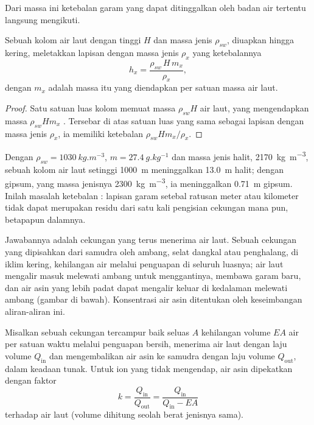 Dari massa ini ketebalan garam yang dapat ditinggalkan oleh badan air tertentu langsung mengikuti.

\begin{proposition}\label{prop:b1:chemical-biogenic-sediments:column}
Sebuah kolom air laut dengan tinggi $H$ dan massa jenis $\rho_{sw}$, diuapkan hingga kering, meletakkan lapisan  dengan massa jenis $\rho_x$ yang ketebalannya
\[
h_x = \frac{\rho_{sw}\,H\,m_x}{\rho_x},
\]
dengan $m_x$ adalah massa  itu yang diendapkan per satuan massa air laut.
\end{proposition}

\begin{proof}
Satu satuan luas kolom memuat massa $\rho_{sw}H$ air laut, yang mengendapkan massa $\rho_{sw}Hm_x$ . Tersebar di atas satuan luas yang sama sebagai lapisan dengan massa jenis $\rho_x$, ia memiliki ketebalan $\rho_{sw}Hm_x/\rho_x$.
\end{proof}

Dengan $\rho_{sw} = \qty{1030}{kg.m^{-3}}$, $m = \qty{27.4}{g.kg^{-1}}$ dan massa jenis halit, \qty{2170}{kg.m^{-3}}, sebuah kolom air laut setinggi \qty{1000}{m} meninggalkan \qty{13.0}{m} halit; dengan gipsum, yang massa jenisnya \qty{2300}{kg.m^{-3}}, ia meninggalkan \qty{0.71}{m} gipsum. Inilah masalah ketebalan : lapisan garam setebal ratusan meter atau kilometer tidak dapat merupakan residu dari satu kali pengisian cekungan mana pun, betapapun dalamnya.

Jawabannya adalah cekungan yang terus menerima air laut. Sebuah cekungan yang dipisahkan dari samudra oleh ambang, selat dangkal atau penghalang, di iklim kering, kehilangan air melalui penguapan di seluruh luasnya; air laut mengalir masuk melewati ambang untuk menggantinya, membawa garam baru, dan air asin yang lebih padat dapat mengalir keluar di kedalaman melewati ambang (gambar di bawah). Konsentrasi air asin ditentukan oleh keseimbangan aliran-aliran ini.

\begin{proposition}\label{prop:b1:chemical-biogenic-sediments:barred}
Misalkan sebuah cekungan tercampur baik seluas $A$ kehilangan volume $EA$ air per satuan waktu melalui penguapan bersih, menerima air laut dengan laju volume $Q_{\mathrm{in}}$ dan mengembalikan air asin ke samudra dengan laju volume $Q_{\mathrm{out}}$, dalam keadaan tunak. Untuk ion yang tidak mengendap, air asin dipekatkan dengan faktor
\[
k = \frac{Q_{\mathrm{in}}}{Q_{\mathrm{out}}} = \frac{Q_{\mathrm{in}}}{Q_{\mathrm{in}} - EA}
\]
terhadap air laut (volume dihitung seolah berat jenisnya sama).
\end{proposition}

